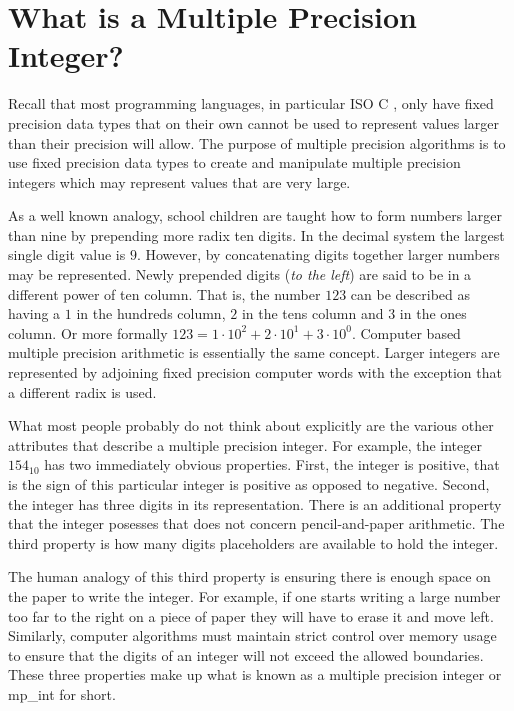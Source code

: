 \documentclass[b5paper]{book}
\begin{document}
\section{What is a Multiple Precision Integer?}
Recall that most programming languages, in particular ISO C \cite{ISOC}, only have fixed precision data types that on their own cannot 
be used to represent values larger than their precision will allow. The purpose of multiple precision algorithms is 
to use fixed precision data types to create and manipulate multiple precision integers which may represent values 
that are very large.  

As a well known analogy, school children are taught how to form numbers larger than nine by prepending more radix ten digits.  In the decimal system
the largest single digit value is $9$.  However, by concatenating digits together larger numbers may be represented.  Newly prepended digits 
(\textit{to the left}) are said to be in a different power of ten column.  That is, the number $123$ can be described as having a $1$ in the hundreds 
column, $2$ in the tens column and $3$ in the ones column.  Or more formally $123 = 1 \cdot 10^2 + 2 \cdot 10^1 + 3 \cdot 10^0$.  Computer based 
multiple precision arithmetic is essentially the same concept.  Larger integers are represented by adjoining fixed 
precision computer words with the exception that a different radix is used.

What most people probably do not think about explicitly are the various other attributes that describe a multiple precision 
integer.  For example, the integer $154_{10}$ has two immediately obvious properties.  First, the integer is positive, 
that is the sign of this particular integer is positive as opposed to negative.  Second, the integer has three digits in 
its representation.  There is an additional property that the integer posesses that does not concern pencil-and-paper 
arithmetic.  The third property is how many digits placeholders are available to hold the integer.  

The human analogy of this third property is ensuring there is enough space on the paper to write the integer.  For example,
if one starts writing a large number too far to the right on a piece of paper they will have to erase it and move left.  
Similarly, computer algorithms must maintain strict control over memory usage to ensure that the digits of an integer
will not exceed the allowed boundaries.  These three properties make up what is known as a multiple precision 
integer or mp\_int for short.  
\end{document}
